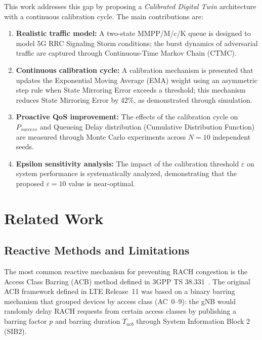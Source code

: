 \documentclass[conference]{IEEEtran}
\begin{document}
This work addresses this gap by proposing a \emph{Calibrated Digital Twin} architecture with a continuous calibration cycle. The main contributions are:

\begin{enumerate}

\item \textbf{Realistic traffic model:} A two-state MMPP/M/c/K queue is designed to model 5G RRC Signaling Storm conditions; the burst dynamics of adversarial traffic are captured through Continuous-Time Markov Chain (CTMC).

\item \textbf{Continuous calibration cycle:} A calibration mechanism is presented that updates the Exponential Moving Average (EMA) weight using an asymmetric step rule when State Mirroring Error exceeds a threshold; this mechanism reduces State Mirroring Error by 42\%, as demonstrated through simulation.

\item \textbf{Proactive QoS improvement:} The effects of the calibration cycle on $P_{success}$ and Queueing Delay distribution (Cumulative Distribution Function) are measured through Monte Carlo experiments across $N=10$ independent seeds.

\item \textbf{Epsilon sensitivity analysis:} The impact of the calibration threshold $\varepsilon$ on system performance is systematically analyzed, demonstrating that the proposed $\varepsilon=10$ value is near-optimal.

\end{enumerate}

\section{Related Work}

\subsection{Reactive Methods and Limitations}

The most common reactive mechanism for preventing RACH congestion is the Access Class Barring (ACB) method defined in 3GPP TS 38.331~\cite{b4}. The original ACB framework defined in LTE Release~11 was based on a binary barring mechanism that grouped devices by access class (AC~0--9): the gNB would randomly delay RACH requests from certain access classes by publishing a barring factor $p$ and barring duration $T_{acb}$ through System Information Block 2 (SIB2).
\end{document}
